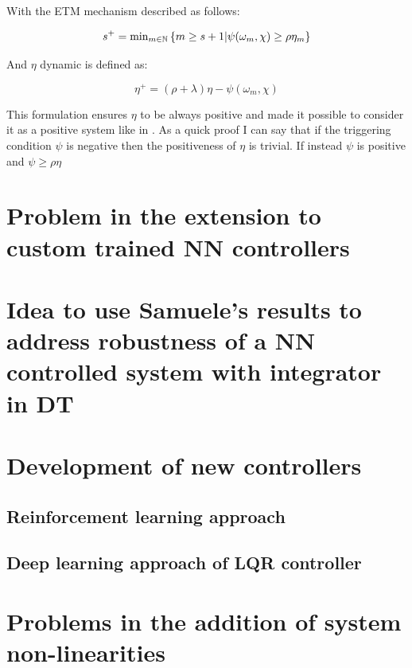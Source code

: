 \documentclass{article}
\begin{document}
With the ETM mechanism described as follows:

\begin{equation} \label{ETM-mechanism}
s^{+} = \text{min}_{m \in {\mathbb{N}}} \left\{ m \geq s + 1 | \psi(\omega_m, \chi) \geq \rho \eta_m \right\}
\end{equation}


And $\eta$ dynamic is defined as:

\begin{equation} \label{eta-dyn}
  \eta^{+} = (\rho + \lambda) \eta - \psi(\omega_m, \chi)
\end{equation}
  

This formulation ensures $\eta$ to be always positive and made it possible to consider it as a positive system like in \cite{positive-systems}. 
As a quick proof I can say that if the triggering condition $\psi$ is negative then the positiveness of $\eta$ is trivial. If instead $\psi$ is positive and $\psi \geq \rho \eta $

\section*{Problem in the extension to custom trained NN controllers}

\section*{Idea to use Samuele's results to address robustness of a NN controlled system with integrator in DT}

\section*{Development of new controllers}

\subsection*{Reinforcement learning approach}

\subsection*{Deep learning approach of LQR controller} 

\section*{Problems in the addition of system non-linearities} 
\end{document}
